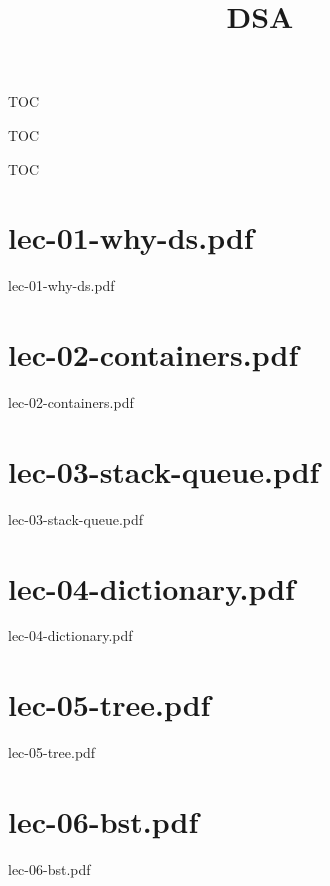 \documentclass[aspectratio = 169]{beamer}
\title{DSA}
\begin{document}
\maketitle
\begin{frame}{TOC}
\tableofcontents[sections=1-8]
\end{frame}
\begin{frame}{TOC}
\tableofcontents[sections=9-16]
\end{frame}
\begin{frame}{TOC}
\tableofcontents[sections=17-18]
\end{frame}
\section{lec-01-why-ds.pdf}
\begin{frame}{lec-01-why-ds.pdf}
\end{frame}

\section{lec-02-containers.pdf}
\begin{frame}{lec-02-containers.pdf}
\end{frame}

\section{lec-03-stack-queue.pdf}
\begin{frame}{lec-03-stack-queue.pdf}
\end{frame}

\section{lec-04-dictionary.pdf}
\begin{frame}{lec-04-dictionary.pdf}
\end{frame}

\section{lec-05-tree.pdf}
\begin{frame}{lec-05-tree.pdf}
\end{frame}

\section{lec-06-bst.pdf}
\begin{frame}{lec-06-bst.pdf}
\end{frame}

\end{document}
